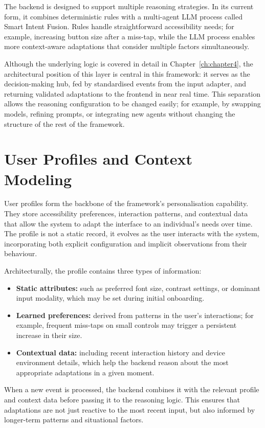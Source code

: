 \documentclass[openany]{book}
\begin{document}
The backend is designed to support multiple reasoning strategies. In its current form, it combines deterministic rules with a multi-agent LLM process called Smart Intent Fusion. Rules handle straightforward accessibility needs; for example, increasing button size after a miss-tap, while the LLM process enables more context-aware adaptations that consider multiple factors simultaneously.

Although the underlying logic is covered in detail in Chapter~\ref{ch:chapter4}, the architectural position of this layer is central in this framework: it serves as the decision-making hub, fed by standardised events from the input adapter, and returning validated adaptations to the frontend in near real time. This separation allows the reasoning configuration to be changed easily; for example, by swapping models, refining prompts, or integrating new agents without changing the structure of the rest of the framework.

\section{User Profiles and Context Modeling}
User profiles form the backbone of the framework’s personalisation capability. They store accessibility preferences, interaction patterns, and contextual data that allow the system to adapt the interface to an individual’s needs over time. The profile is not a static record, it evolves as the user interacts with the system, incorporating both explicit configuration and implicit observations from their behaviour.

Architecturally, the profile contains three types of information:
\begin{itemize}
    \item \textbf{Static attributes:} such as preferred font size, contrast settings, or dominant input modality, which may be set during initial onboarding.
    \item \textbf{Learned preferences:} derived from patterns in the user’s interactions; for example, frequent miss-taps on small controls may trigger a persistent increase in their size.
    \item \textbf{Contextual data:} including recent interaction history and device environment details, which help the backend reason about the most appropriate adaptations in a given moment.
\end{itemize}
When a new event is processed, the backend combines it with the relevant profile and context data before passing it to the reasoning logic. This ensures that adaptations are not just reactive to the most recent input, but also informed by longer-term patterns and situational factors.
\end{document}
